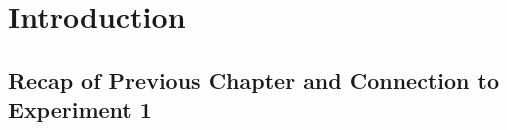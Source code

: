 




\section{Introduction}

\subsection{Recap of Previous Chapter and Connection to Experiment 1}


